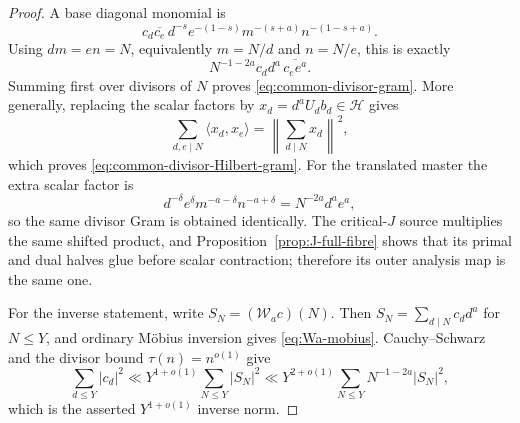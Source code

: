 \begin{proof}
A base diagonal monomial is
\[
c_d\overline{c_e}\,
d^{-s}e^{-(1-s)}m^{-(s+a)}n^{-(1-s+a)}.
\]
Using $dm=en=N$, equivalently $m=N/d$ and $n=N/e$, this is exactly
\[
N^{-1-2a}c_dd^a\,\overline{c_ee^a}.
\]
Summing first over divisors of $N$ proves \eqref{eq:common-divisor-gram}. More
generally, replacing the scalar factors by
$x_d=d^aU_db_d\in\mathcal H$ gives
\[
\sum_{d,e\mid N}\langle x_d,x_e\rangle
=\left\|\sum_{d\mid N}x_d\right\|^2,
\]
which proves \eqref{eq:common-divisor-Hilbert-gram}. For the translated master
the extra scalar factor is
\[
d^{-\delta}e^{\delta}m^{-a-\delta}n^{-a+\delta}
=N^{-2a}d^ae^a,
\]
so the same divisor Gram is obtained identically. The critical-$J$ source
multiplies the same shifted product, and Proposition~\ref{prop:J-full-fibre}
shows that its primal and dual halves glue before scalar contraction; therefore
its outer analysis map is the same one.

For the inverse statement, write
$S_N=(\mathcal W_ac)(N)$. Then
$S_N=\sum_{d\mid N}c_dd^a$ for $N\le Y$, and ordinary M\"obius inversion gives
\eqref{eq:Wa-mobius}. Cauchy--Schwarz and the divisor bound
$\tau(n)=n^{o(1)}$ give
\[
\sum_{d\le Y}|c_d|^2
\ll Y^{1+o(1)}\sum_{N\le Y}|S_N|^2
\ll Y^{2+o(1)}\sum_{N\le Y}N^{-1-2a}|S_N|^2,
\]
which is the asserted $Y^{1+o(1)}$ inverse norm.


\end{proof}
